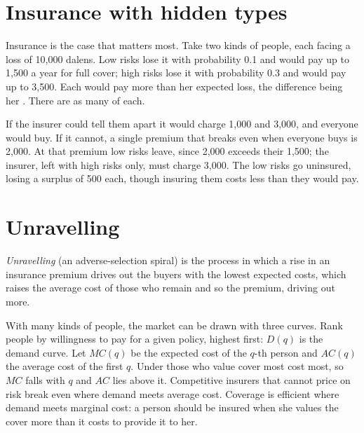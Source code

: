 \section{Insurance with hidden types}\label{sec:b2:adverse-selection:insurance}

Insurance is the case that matters most. Take two kinds of people, each facing a loss of 10{,}000 dalens. Low risks
lose it with probability 0.1 and would pay up to 1{,}500 a year for full cover; high risks lose it with probability 0.3 and
would pay up to 3{,}500. Each would pay more than her expected loss, the difference being her . There are as
many of each.

If the insurer could tell them apart it would charge 1{,}000 and 3{,}000, and everyone would buy. If it cannot, a single
premium that breaks even when everyone buys is 2{,}000. At that premium low risks leave, since 2{,}000 exceeds their 1{,}500; the
insurer, left with high risks only, must charge 3{,}000. The low risks go uninsured, losing a surplus of 500 each, though
insuring them costs less than they would pay.

\section{Unravelling}\label{sec:b2:adverse-selection:unravelling}

\begin{definition}[Unravelling]\label{def:b2:adverse-selection:unravelling}
\emph{Unravelling} (an adverse-selection spiral) is the process in which a rise in an insurance
premium drives out the buyers with the lowest expected costs, which raises the average cost of those who remain and
so the premium, driving out more.
\end{definition}

With many kinds of people, the market can be drawn with three curves. Rank people by willingness to pay for a
given policy, highest first: $D(q)$ is the demand curve. Let $\mathit{MC}(q)$ be the expected cost of the $q$-th person and $\mathit{AC}(q)$ the
average cost of the first $q$. Under  those who value cover most cost most, so $\mathit{MC}$ falls with $q$ and
$\mathit{AC}$ lies above it. Competitive insurers that cannot price on risk break even where demand meets average cost.
Coverage is efficient where demand meets marginal cost: a person should be insured when she values the cover more
than it costs to provide it to her.

